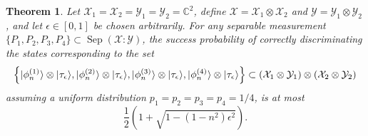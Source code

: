 \documentclass[11pt]{article}
\newtheorem{theorem}{Theorem}
\theoremstyle{definition}
\newcommand{\microspace}{\mspace{0.5mu}}
\newcommand{\sep}{\operatorname{Sep}}
\newcommand{\ket}[1]{
  \lvert\microspace #1 \microspace \rangle}
\newcommand{\complex}{\mathbb{C}}
\newcommand{\X}{\mathcal{X}}
\newcommand{\Y}{\mathcal{Y}}
\begin{document}
\begin{theorem}
    Let $\X_1 = \X_2 = \Y_1 = \Y_2 = \complex^2$, define $\X = \X_1 \otimes
    \X_2$ and $\Y = \Y_1 \otimes \Y_2$, and let $\epsilon \in [0,1]$ be chosen
    arbitrarily. For any separable measurement $\{ P_1, P_2, P_3, P_4 \}
    \subset \sep(\X : \Y)$, the success probability of correctly discriminating
    the states corresponding to the set 
	\begin{equation}
        \left\{ 
            \ket{\phi_n^{(1)}} \otimes \ket{\tau_{\epsilon}},
            \ket{\phi_n^{(2)}} \otimes \ket{\tau_{\epsilon}},
            \ket{\phi_n^{(3)}} \otimes \ket{\tau_{\epsilon}},
            \ket{\phi_n^{(4)}} \otimes \ket{\tau_{\epsilon}} 
        \right\} \subset 
        \left(\X_1 \otimes \Y_1 \right) \otimes \left(\X_2 \otimes \Y_2 \right)
	\end{equation}
    assuming a uniform distribution $p_1 = p_2 = p_3 = p_4 = 1/4$, is at most
    \begin{equation}
        \frac{1}{2} \left(1 + \sqrt{1 - (1 - n^2) \epsilon^2} \right).
    \end{equation}
\end{theorem}
\end{document}
